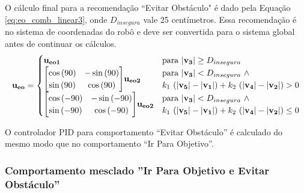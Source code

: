 		O cálculo final para a recomendação ``Evitar Obstáculo" é dado pela Equação 
		\ref{eq:eo_comb_linear3}, onde $D_{insegura}$ vale 25 centímetros. Essa recomendação 
		é no sistema de coordenadas do robô e deve ser convertida para o sistema global antes 
		de continuar os cálculos.
		\begin{equation}
			\label{eq:eo_comb_linear3}
			\mathbf{u_{eo}} = 
			\begin{cases}
				\mathbf{u_{eo1}} & \text{para} \ | \mathbf{v_3} | \geq D_{insegura} \\
				
				\mleft[
				\begin{matrix}
		  			\cos{(90)} & -\sin{(90)} \\
		  			\sin{(90)} & \cos{(90)} \\
				\end{matrix}
				\mright] \mathbf{u_{eo2}} & 				
				\begin{matrix*}[l]
		  			\text{para} \ | \mathbf{v_3} | < D_{insegura} \ \land \\
		  			k_1 \ (|\mathbf{v_5}| - |\mathbf{v_1}|) + k_2 \ (|\mathbf{v_4}| - |\mathbf{v_2}|)
					> 0 \\
				\end{matrix*} \\
				
				\mleft[
				\begin{matrix}
		  			\cos{(-90)} & -\sin{(-90)} \\
		  			\sin{(-90)} & \cos{(-90)} \\
				\end{matrix}
				\mright] \mathbf{u_{eo2}} & 
				\begin{matrix*}[l]
		  			\text{para} \ | \mathbf{v_3} | < D_{insegura} \ \land \\
		  			k_1 \ (|\mathbf{v_5}| - |\mathbf{v_1}|) + k_2 \ (|\mathbf{v_4}| - |\mathbf{v_2}|)
					\leq 0 \\
				\end{matrix*} \\
			\end{cases}
		\end{equation}
		
		O controlador PID para comportamento ``Evitar Obstáculo'' é calculado do mesmo modo
		que no comportamento ``Ir Para Objetivo''.
		
		\subsubsection{Comportamento mesclado ''Ir Para Objetivo e Evitar Obstáculo''}
		

